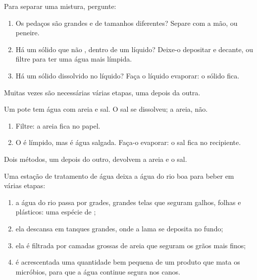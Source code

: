 \begin{method}\label{met:g3:separating-mixtures:choose}
Para separar uma mistura, pergunte:
\begin{enumerate}
  \item Os pedaços são grandes e de tamanhos diferentes? Separe com a
        mão, ou peneire.
  \item Há um sólido que não , dentro de um líquido? Deixe-o
        depositar e decante, ou filtre para ter uma água mais límpida.
  \item Há um sólido dissolvido no líquido? Faça o líquido evaporar: o
        sólido fica.
\end{enumerate}
Muitas vezes são necessárias várias etapas, uma depois da outra.
\end{method}

\begin{example}\label{ex:g3:separating-mixtures:three}
Um pote tem água com areia e sal. O sal se dissolveu; a areia, não.
\begin{enumerate}
  \item Filtre: a areia fica no papel.
  \item O  é límpido, mas é água salgada. Faça-o evaporar: o sal
        fica no recipiente.
\end{enumerate}
Dois métodos, um depois do outro, devolvem a areia e o sal.
\end{example}

\begin{example}\label{ex:g3:separating-mixtures:plant}
Uma estação de tratamento de água deixa a água do rio boa para beber em
várias etapas:
\begin{enumerate}
  \item a água do rio passa por grades, grandes telas que seguram
        galhos, folhas e plásticos: uma espécie de ;
  \item ela descansa em tanques grandes, onde a lama se deposita no
        fundo;
  \item ela é filtrada por camadas grossas de areia que seguram os grãos
        mais finos;
  \item é acrescentada uma quantidade bem pequena de um produto que mata
        os micróbios, para que a água continue segura nos canos.
\end{enumerate}
\end{example}

